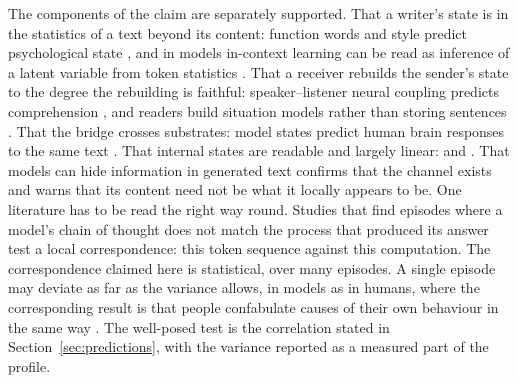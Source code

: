 The components of the claim are separately supported. That a writer's state is in the statistics of a
text beyond its content: function words and style predict psychological state
\citep{tausczik2010,pennebaker2011}, and in models in-context learning can be read as inference of a
latent variable from token statistics \citep{xie2022}. That a receiver rebuilds the sender's state to
the degree the rebuilding is faithful: speaker--listener neural coupling predicts comprehension
\citep{stephens2010,hasson2012}, and readers build situation models rather than storing sentences
\citep{zwaan1998}. That the bridge crosses substrates: model states predict human brain responses to
the same text \citep{schrimpf2021,goldstein2022,caucheteux2022}. That internal states are readable
and largely linear: \citet{zou2023} and \citet{park2024}. That models can hide information in
generated text \citep{roger2023} confirms that the channel exists and warns that its content need not
be what it locally appears to be. One literature has to be read the
right way round. Studies that find episodes where a model's chain of thought does not match the
process that produced its answer \citep{lanham2023,turpin2023} test a local correspondence: this token
sequence against this computation. The correspondence claimed here is statistical, over many episodes.
A single episode may deviate as far as the variance allows, in models as in humans, where the
corresponding result is that people confabulate causes of their own behaviour in the same way
\citep{nisbett1977}. The well-posed test is the correlation stated in Section~\ref{sec:predictions},
with the variance reported as a measured part of the profile.
